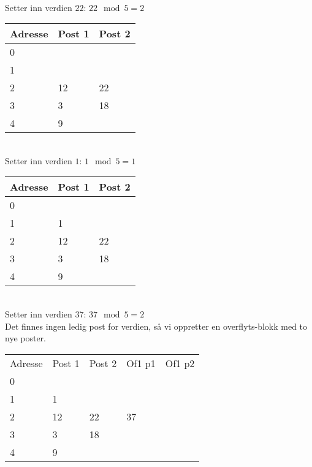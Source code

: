 ~\\
Setter inn verdien $22$: $22 \mod 5 = 2$\\
\begin{tabular}{|l|l|l|}
    \hline
    Adresse & Post 1 & Post 2 \\ \hline
    0       & ~      & ~      \\ \hline
    1       & ~      & ~      \\ \hline
    2       & 12     & 22     \\ \hline
    3       & 3      & 18     \\ \hline
    4       & 9      & ~      \\ \hline
\end{tabular}

~\\
Setter inn verdien $1$: $1 \mod 5 = 1$\\
\begin{tabular}{|l|l|l|}
    \hline
    Adresse & Post 1 & Post 2 \\ \hline
    0       & ~      & ~      \\ \hline
    1       & 1      & ~      \\ \hline
    2       & 12     & 22     \\ \hline
    3       & 3      & 18     \\ \hline
    4       & 9      & ~      \\ \hline
\end{tabular}

~\\
Setter inn verdien $37$: $37 \mod 5 = 2$\\
Det finnes ingen ledig post for verdien, så vi oppretter en overflyts-blokk med to nye poster.\\
\begin{tabular}{|l|l|l|l|l|}
    \hline
    Adresse & Post 1 & Post 2 & Of1 p1 & Of1 p2 \\
    0       & ~      & ~      &\cellcolor{gray}&\cellcolor{gray}\\ \hline
    1       & 1      & ~      &\cellcolor{gray}&\cellcolor{gray}\\ \hline
    2       & 12     & 22     & 37     & ~      \\ \hline
    3       & 3      & 18     &\cellcolor{gray}&\cellcolor{gray}\\ \hline
    4       & 9      & ~      &\cellcolor{gray}&\cellcolor{gray}\\ \hline
\end{tabular}

